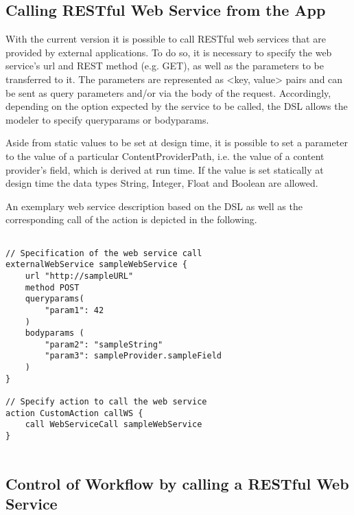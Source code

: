 \subsection{Calling RESTful Web Service from the App}
\label{subsec: CallingWebServices}
With the current \MD version it is possible to call RESTful web services that are provided by external applications. To do so, it is necessary to specify the web service's url and REST method (e.g. GET), as well as the parameters to be transferred to it. The parameters are represented as <key, value> pairs and can be sent as query parameters and/or via the body of the request. Accordingly, depending on the option expected by the service to be called, the DSL allows the modeler to specify queryparams or bodyparams. 

Aside from static values to be set at design time, it is possible to set a parameter to the value of a particular ContentProviderPath, i.e. the value of a content provider's field, which is derived at run time. If the value is set statically at design time the data types String, Integer, Float and Boolean are allowed. 

An exemplary web service description based on the DSL as well as the corresponding call of the action is depicted in the following.

\begin{lstlisting}

// Specification of the web service call
externalWebService sampleWebService {
	url "http://sampleURL"
	method POST
	queryparams(
		"param1": 42	
	)
	bodyparams (
		"param2": "sampleString"
		"param3": sampleProvider.sampleField
	)
}

// Specify action to call the web service
action CustomAction callWS {
	call WebServiceCall sampleWebService
}
	
\end{lstlisting}





\subsection{Control of Workflow by calling a RESTful Web Service}
\label{subsec: WorkflowControlThroughWS}